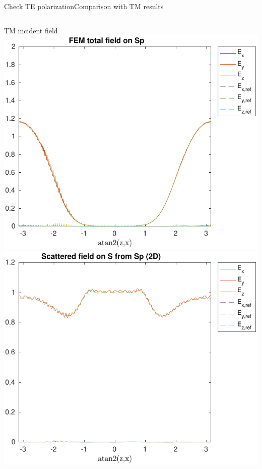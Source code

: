 \begin{frame}[allowframebreaks]{Check TE polarization}{Comparison
      with TM results}
    \begin{columns}
      \hfill TM incident field \hfill\mbox{}
      \vspace{1ex}
      \includegraphics[width=\linewidth]{results/TM/E_Sp.pdf}
      \includegraphics[width=\linewidth]{results/TM/E_S.pdf}
      

\end{columns}
\end{frame}
